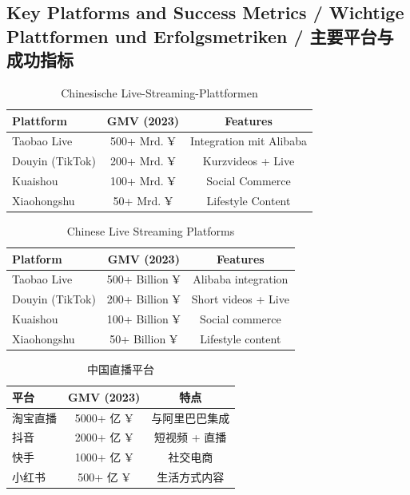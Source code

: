 \subsection{Key Platforms and Success Metrics / Wichtige Plattformen und Erfolgsmetriken / 主要平台与成功指标}

\begin{otherlanguage}{ngerman}
\begin{table}[h]
\centering
\begin{tabular}{lcc}
\toprule
\textbf{Plattform} & \textbf{GMV (2023)} & \textbf{Features} \\
\midrule
Taobao Live & 500+ Mrd. ¥ & Integration mit Alibaba \\
Douyin (TikTok) & 200+ Mrd. ¥ & Kurzvideos + Live \\
Kuaishou & 100+ Mrd. ¥ & Social Commerce \\
Xiaohongshu & 50+ Mrd. ¥ & Lifestyle Content \\
\bottomrule
\end{tabular}
\caption{Chinesische Live-Streaming-Plattformen}
\end{table}
\end{otherlanguage}

\begin{table}[h]
\centering
\begin{tabular}{lcc}
\toprule
\textbf{Platform} & \textbf{GMV (2023)} & \textbf{Features} \\
\midrule
Taobao Live & 500+ Billion ¥ & Alibaba integration \\
Douyin (TikTok) & 200+ Billion ¥ & Short videos + Live \\
Kuaishou & 100+ Billion ¥ & Social commerce \\
Xiaohongshu & 50+ Billion ¥ & Lifestyle content \\
\bottomrule
\end{tabular}
\caption{Chinese Live Streaming Platforms}
\end{table}

\begin{table}[h]
\centering
\begin{tabular}{lcc}
\toprule
\textbf{平台} & \textbf{GMV (2023)} & \textbf{特点} \\
\midrule
淘宝直播 & 5000+ 亿 ¥ & 与阿里巴巴集成 \\
抖音 & 2000+ 亿 ¥ & 短视频 + 直播 \\
快手 & 1000+ 亿 ¥ & 社交电商 \\
小红书 & 500+ 亿 ¥ & 生活方式内容 \\
\bottomrule
\end{tabular}
\caption{中国直播平台}
\end{table}

